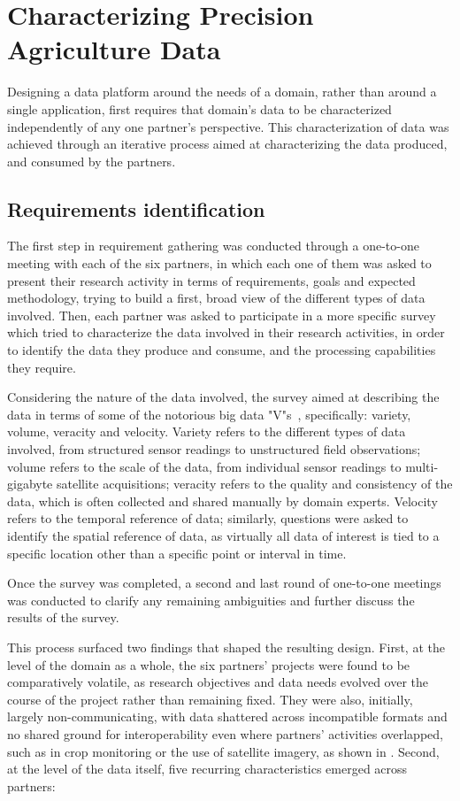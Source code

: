 \section{Characterizing Precision Agriculture Data}
\label{sec:dataplat-characterization}

Designing a data platform around the needs of a domain, rather than around a single application, first requires that domain's data to be characterized independently of any one partner's perspective. This characterization of data was achieved through an iterative process aimed at characterizing the data produced, and consumed by the partners.

\subsection{Requirements identification}

The first step in requirement gathering was conducted through a one-to-one meeting with each of the six partners, in which each one of them was asked to present their research activity in terms of requirements, goals and expected methodology, trying to build a first, broad view of the different types of data involved.
Then, each partner was asked to participate in a more specific survey which tried to characterize the data involved in their research activities, in order to identify the data they produce and consume, and the processing capabilities they require.

Considering the nature of the data involved, the survey aimed at describing the data in terms of some of the notorious big data "V"s~\cite{DeMauro2016}, specifically: variety, volume, veracity and velocity. Variety refers to the different types of data involved, from structured sensor readings to unstructured field observations; volume refers to the scale of the data, from individual sensor readings to multi-gigabyte satellite acquisitions; veracity refers to the quality and consistency of the data, which is often collected and shared manually by domain experts. Velocity refers to the temporal reference of data; similarly, questions were asked to identify the spatial reference of data, as virtually all data of interest is tied to a specific location other than a specific point or interval in time.

Once the survey was completed, a second and last round of one-to-one meetings was conducted to clarify any remaining ambiguities and further discuss the results of the survey.

This process surfaced two findings that shaped the resulting design. First, at the level of the domain as a whole, the six partners' projects were found to be comparatively volatile, as research objectives and data needs evolved over the course of the project rather than remaining fixed. They were also, initially, largely non-communicating, with data shattered across incompatible formats and no shared ground for interoperability even where partners' activities overlapped, such as in crop monitoring or the use of satellite imagery, as shown in . Second, at the level of the data itself, five recurring characteristics emerged across partners:

